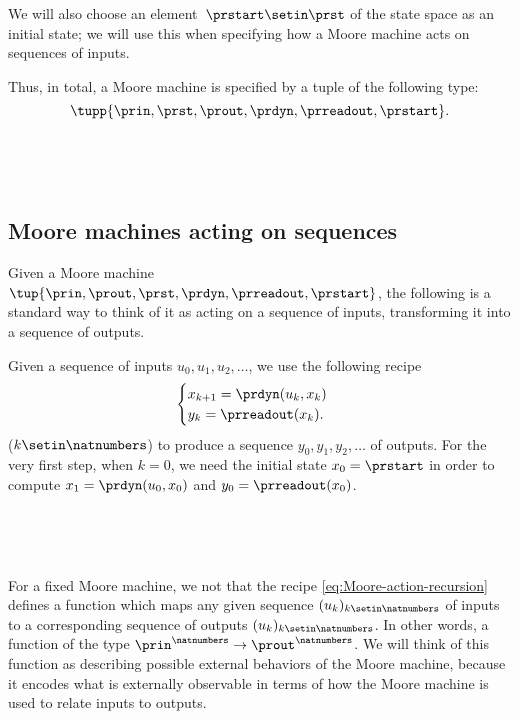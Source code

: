 We will also choose an element~$\prstart \setin \prst$ of the state space as an initial state; we will use this when specifying how a Moore machine acts on sequences of inputs.

Thus, in total, a Moore machine is specified by a tuple of the following type:
\begin{equation}
    \label{eq:moore-tuple}
    \tupp{\prin,\prst,\prout,\prdyn,\prreadout,\prstart}.
\end{equation}

\


\

\subsection{Moore machines acting on sequences}

Given a Moore machine $\tup{\prin, \prout, \prst, \prdyn, \prreadout, \prstart}$, the following is a standard way to think of it as acting on a sequence of inputs, transforming it into a sequence of outputs. 

Given a sequence of inputs $u_0, u_1, u_2, \dots $, we use the following recipe
\begin{equation}
    \label{eq:Moore-action-recursion}
    \begin{cases}
        x_{k+1} = \prdyn(u_k, x_k) \\
        y_{k}   = \prreadout(x_{k}).
    \end{cases}
\end{equation}
   ($k \setin \natnumbers$) to produce a sequence $y_0, y_1, y_2, \dots $ of outputs. For the very first step, when $k = 0$, we need the initial state $x_0 = \prstart$ in order to compute $x_1 = \prdyn(u_0, x_0)$ and $y_0 = \prreadout(x_0)$. 



\


\


For a fixed Moore machine, we not that the recipe \cref{eq:Moore-action-recursion} defines a function which maps any given sequence $(u_k)_{k \setin \natnumbers}$ of inputs to a corresponding sequence of outputs $(u_k)_{k \setin \natnumbers}$. In other words, a function of the type $\prin^\natnumbers \to \prout^\natnumbers$. 
We will think of this function as describing possible external behaviors of the Moore machine, because it encodes what is externally observable in terms of how the Moore machine is used to relate inputs to outputs.

